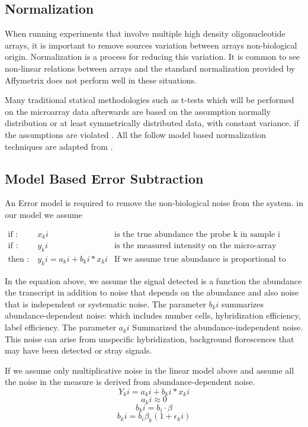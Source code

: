 \documentclass[a4paper,11pt,twoside]{book}
\begin{document}
	\subsection{Normalization}
	When running experiments that involve multiple high density oligonucleotide arrays, it is important to remove sources variation between arrays non-biological origin. Normalization is a process for reducing this variation. It is common to see non-linear relations between arrays and the standard normalization provided by Affymetrix does not perform well in these situations\cite{Bolstad2003}.
	
	Many traditional statical methodologies such as t-tests which will be performed on the microarray data afterwards are based on the assumption normally distribution or at least symmetrically distributed data, with constant variance. if the assumptions are violated . All the follow model based normalization techniques are adapted from \citep{Durbin2002}. 
	\subsection{Model Based Error Subtraction}
	An Error model is required to remove the non-biological noise from the system. in our model we assume 
	
	\begin{align*}
	\text{if : }  & x_ki & \text{is the true abundance the probe k in sample i} \\
	\text{if : }  & y_ki & \text{is the measured intensity on the micro-array} \\
	\text{then : }  & y_ki = a_ki + b_ki * x_ki & \text{If we assume true abundance is proportional to signal intensity}
	\end{align*}
	
	In the equation above, we assume the signal detected is a function the abundance the transcript in addition to noise that depends on the abundance and also noise that is independent or systematic noise. The parameter $b_ki$ summarizes abundance-dependent noise: which includes number cells, hybridization efficiency, label efficiency. The parameter  $a_ki$ Summarized the abundance-independent noise. This noise can arise from unspecific hybridization, background florescences that may have been detected or stray signals. 
	
	If we assume only multiplicative noise in the linear model above and assume all the noise in the measure is derived from abundance-dependent noise. 
	$$ Y_ki = a_ki + b_ki * x_ki $$
	$$ a_ki \approx 0 $$
	$$ b_ki = b_i \cdot\beta $$
	$$ b_ki = b_i\beta_k(1+\epsilon_ki) $$
	
\end{document}
